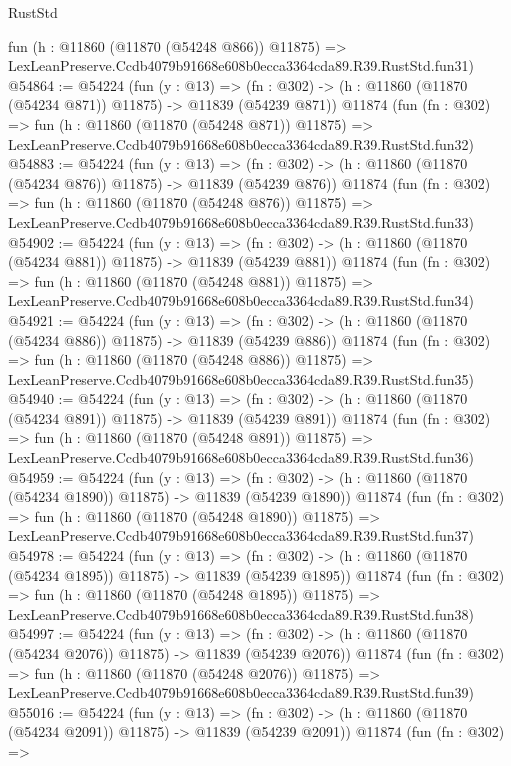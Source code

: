 \begin{lexlean}{RustStd}
\begin{coremodule}
    fun (h : @11860 (@11870 (@54248 @866)) @11875) =>
    LexLeanPreserve.Ccdb4079b91668e608b0ecca3364cda89.R39.RustStd.fun31)
@54864 := @54224
    (fun (y : @13) =>
    (fn : @302) -> (h : @11860 (@11870 (@54234 @871)) @11875) -> @11839 (@54239 @871))
    @11874
    (fun (fn : @302) =>
    fun (h : @11860 (@11870 (@54248 @871)) @11875) =>
    LexLeanPreserve.Ccdb4079b91668e608b0ecca3364cda89.R39.RustStd.fun32)
@54883 := @54224
    (fun (y : @13) =>
    (fn : @302) -> (h : @11860 (@11870 (@54234 @876)) @11875) -> @11839 (@54239 @876))
    @11874
    (fun (fn : @302) =>
    fun (h : @11860 (@11870 (@54248 @876)) @11875) =>
    LexLeanPreserve.Ccdb4079b91668e608b0ecca3364cda89.R39.RustStd.fun33)
@54902 := @54224
    (fun (y : @13) =>
    (fn : @302) -> (h : @11860 (@11870 (@54234 @881)) @11875) -> @11839 (@54239 @881))
    @11874
    (fun (fn : @302) =>
    fun (h : @11860 (@11870 (@54248 @881)) @11875) =>
    LexLeanPreserve.Ccdb4079b91668e608b0ecca3364cda89.R39.RustStd.fun34)
@54921 := @54224
    (fun (y : @13) =>
    (fn : @302) -> (h : @11860 (@11870 (@54234 @886)) @11875) -> @11839 (@54239 @886))
    @11874
    (fun (fn : @302) =>
    fun (h : @11860 (@11870 (@54248 @886)) @11875) =>
    LexLeanPreserve.Ccdb4079b91668e608b0ecca3364cda89.R39.RustStd.fun35)
@54940 := @54224
    (fun (y : @13) =>
    (fn : @302) -> (h : @11860 (@11870 (@54234 @891)) @11875) -> @11839 (@54239 @891))
    @11874
    (fun (fn : @302) =>
    fun (h : @11860 (@11870 (@54248 @891)) @11875) =>
    LexLeanPreserve.Ccdb4079b91668e608b0ecca3364cda89.R39.RustStd.fun36)
@54959 := @54224
    (fun (y : @13) =>
    (fn : @302) -> (h : @11860 (@11870 (@54234 @1890)) @11875) -> @11839 (@54239 @1890))
    @11874
    (fun (fn : @302) =>
    fun (h : @11860 (@11870 (@54248 @1890)) @11875) =>
    LexLeanPreserve.Ccdb4079b91668e608b0ecca3364cda89.R39.RustStd.fun37)
@54978 := @54224
    (fun (y : @13) =>
    (fn : @302) -> (h : @11860 (@11870 (@54234 @1895)) @11875) -> @11839 (@54239 @1895))
    @11874
    (fun (fn : @302) =>
    fun (h : @11860 (@11870 (@54248 @1895)) @11875) =>
    LexLeanPreserve.Ccdb4079b91668e608b0ecca3364cda89.R39.RustStd.fun38)
@54997 := @54224
    (fun (y : @13) =>
    (fn : @302) -> (h : @11860 (@11870 (@54234 @2076)) @11875) -> @11839 (@54239 @2076))
    @11874
    (fun (fn : @302) =>
    fun (h : @11860 (@11870 (@54248 @2076)) @11875) =>
    LexLeanPreserve.Ccdb4079b91668e608b0ecca3364cda89.R39.RustStd.fun39)
@55016 := @54224
    (fun (y : @13) =>
    (fn : @302) -> (h : @11860 (@11870 (@54234 @2091)) @11875) -> @11839 (@54239 @2091))
    @11874
    (fun (fn : @302) =>

\end{coremodule}
\end{lexlean}
